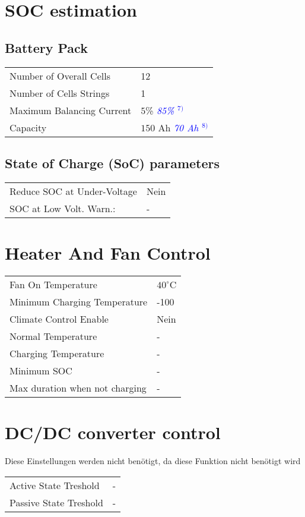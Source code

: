 \section*{SOC estimation}
\subsection*{Battery Pack}
\begin{tabular}{p{11cm}p{3cm}}
	Number of Overall Cells & 12 \\
	Number of Cells Strings & 1 \\
	Maximum Balancing Current & $5$\% \textcolor{blue}{\textit{85\% $^{7)}$}} \\
	Capacity & $150$ Ah \textcolor{blue}{\textit{70 Ah $^{8)}$}}
\end{tabular}

\subsection*{State of Charge (SoC) parameters}
\begin{tabular}{p{11cm}p{2cm}}
	Reduce SOC at Under-Voltage & Nein \\
	SOC at Low Volt. Warn.: & -
\end{tabular}

\section*{Heater And Fan Control}
\begin{tabular}{p{11cm}p{2cm}}
	Fan On Temperature & $40^\circ$C \\
	Minimum Charging Temperature & -100 \\
	Climate Control Enable & Nein \\
	Normal Temperature & - \\
	Charging Temperature & - \\
	Minimum SOC & - \\
	Max duration when not charging & -
\end{tabular}

\section*{DC/DC converter control}
Diese Einstellungen werden nicht benötigt, da diese Funktion nicht benötigt wird \\
\begin{tabular}{p{11cm}p{2cm}}
	Active State Treshold & - \\
	Passive State Treshold & -
\end{tabular}

